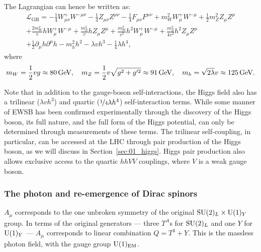 The Lagrangian can hence be written as:
\begin{multline}
	\label{eq:01_sm_ew_gauge_lagrangian_weinberg}
		\mathcal{L}_\mathrm{GH} = -\frac{1}{4} W^+_{\mu\nu} W^{-\mu\nu} - \frac{1}{4} Z_{\mu\nu} Z^{\mu\nu} - \frac{1}{4} F_{\mu\nu} F^{\mu\nu}
		+  m_W^2 W^+_\mu W^{-\mu} + \frac{1}{2} m_Z^2 Z_\mu Z^\mu \\
		+ \frac{2 m_W^2}{v} h W^+_\mu W^{-\mu} + \frac{m_Z^2}{v} h Z_\mu Z^\mu + \frac{m_W^2}{v^2} h^2 W^+_\mu W^{-\mu} + \frac{m_Z^2}{4v^2} h^2 Z_\mu Z^\mu \\
		+ \frac{1}{2}\partial_\mu h \partial^\mu h - m_h^2 h^2 - \lambda v h^3 - \frac{1}{4} \lambda h^4,
\end{multline}
where
\begin{equation}
	\label{eq:01_sm_ew_masses}
	m_W = \frac{1}{2} vg \approx 80 \,\text{Ge\hspace{-.08em}V}, \quad m_Z = \frac{1}{2} v \sqrt{g^2 + g'^2} \approx 91 \,\text{Ge\hspace{-.08em}V}, \quad m_h = \sqrt{2\lambda} v \approx 125 \,\text{Ge\hspace{-.08em}V}.
\end{equation}

Note that in addition to the gauge-boson self-interactions, the Higgs field also has a trilinear ($\lambda v h^3$) and quartic ($\nicefrac{1}{4} \lambda h^4$) self-interaction terms.
While some manner of EWSB has been confirmed experimentally through the discovery of the Higgs boson, its full nature, and the full form of the Higgs potential, can only be determined through measurements of these terms.
The trilinear self-coupling, in particular, can be accessed at the LHC through pair production of the Higgs boson, as we will discuss in Section~\ref{sec:01_higgs}.
Higgs pair production also allows exclusive access to the quartic $hhVV$ couplings, where $V$ is a weak gauge boson.

\subsubsection{The photon and re-emergence of Dirac spinors}

$A_\mu$ corresponds to the one unbroken symmetry of the original $\SU[2]_L \times \UU[1]_Y$ group.
In terms of the original generators --- three $T^A$s for $\SU[2]_L$ and one $Y$ for $\UU[1]_Y$ --- $A_\mu$ corresponds to linear combination $Q = T^3 + Y$.
This is the massless photon field, with the gauge group $\UU[1]_\mathrm{EM}$.

